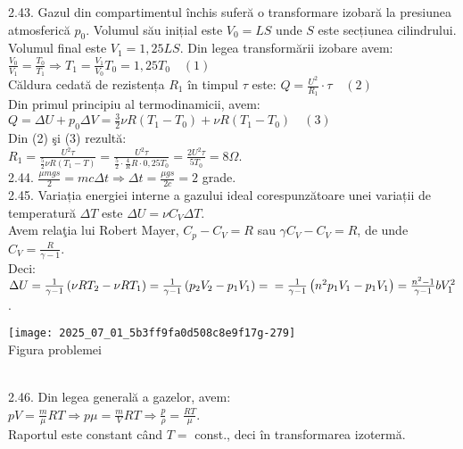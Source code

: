 2.43. Gazul din compartimentul închis suferă o transformare izobară la presiunea atmosferică $p_{0}$. Volumul său inițial este $V_{0}=L S$ unde $S$ este secțiunea cilindrului. Volumul final este $V_{1}=1,25 L S$. Din legea transformării izobare avem:\\ $\frac{V_{0}}{V_{1}}=\frac{T_{0}}{T_{1}} \Rightarrow T_{1}=\frac{V_{1}}{V_{0}} T_{0}=1,25 T_{0} \quad (1)$\\ Căldura cedată de rezistența $R_{1}$ în timpul $\tau$ este: $Q=\frac{U^{2}}{R_{1}} \cdot \tau \quad (2)$\\ Din primul principiu al termodinamicii, avem:\\ $Q=\Delta U+p_{0} \Delta V=\frac{3}{2} \nu R\left(T_{1}-T_{0}\right)+\nu R\left(T_{1}-T_{0}\right) \quad (3)$\\ Din (2) şi (3) rezultă:\\ $R_{1}=\frac{U^{2} \tau}{\frac{5}{2} \nu R\left(T_{1}-T\right)}=\frac{U^{2} \tau}{\frac{5}{2} \cdot \frac{4}{R} R \cdot 0,25 T_{0}}=\frac{2 U^{2} \tau}{5 T_{0}}=8 \Omega$.\\

2.44. $\frac{\mu m g s}{2}=m c \Delta t \Rightarrow \Delta t=\frac{\mu g s}{2 c}=2$ grade.\\

2.45. Variația energiei interne a gazului ideal corespunzătoare unei variații de temperatură $\Delta T$ este $\Delta U=\nu C_{V} \Delta T$.\\ Avem relaţia lui Robert Mayer, $C_{p}-C_{V}=R$ sau $\gamma C_{V}-C_{V}=R$, de unde $C_{V}=\frac{R}{\gamma-1}$.\\ Deci: $\Delta U=\frac{1}{\gamma-1}\left(\nu R T_{2}-\nu R T_{1}\right)=\frac{1}{\gamma-1}\left(p_{2} V_{2}-p_{1} V_{1}\right)= \\ =\frac{1}{\gamma-1}\left(n^{2} p_{1} V_{1}-p_{1} V_{1}\right)=\frac{n^{2}-1}{\gamma-1} b V_{1}^{2}$.\\ \begin{center} \texttt{[image: 2025\_07\_01\_5b3ff9fa0d508c8e9f17g-279]}\\ Figura problemei \end{center}\\

2.46. Din legea generală a gazelor, avem:\\ $p V=\frac{m}{\mu} R T \Rightarrow p \mu=\frac{m}{V} R T \Rightarrow \frac{p}{\rho}=\frac{R T}{\mu}$.\\ Raportul este constant când $T=$ const., deci în transformarea izotermă.\\


